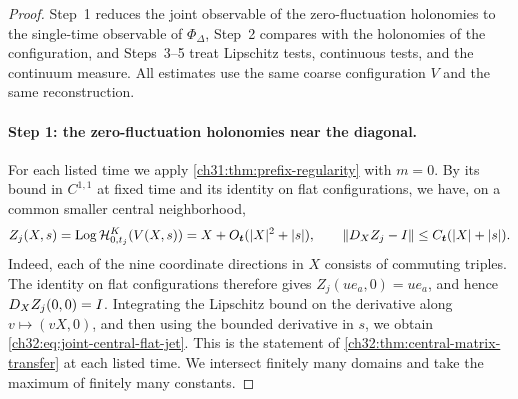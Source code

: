 \begin{proof}
Step~1 reduces the joint observable of the zero-fluctuation holonomies to the single-time observable of $\Phi_\Delta$, Step~2 compares with the holonomies of the configuration, and Steps~3--5 treat Lipschitz tests, continuous tests, and the continuum measure. All estimates use the same coarse configuration $V$ and the same reconstruction.

\paragraph{Step 1: the zero-fluctuation holonomies near the diagonal.}
For each listed time we apply \cref{ch31:thm:prefix-regularity} with $m=0$. By its bound in $C^{1,1}$ at fixed time and its identity on flat configurations, we have, on a common smaller central neighborhood,
\begin{equation}\label{ch32:eq:joint-central-flat-jet}
 Z_j(X,s)=\operatorname{Log}\mathcal H^K_{0,t_j}(V(X,s))=X+O_{\boldsymbol t}(\lvert X\rvert^2+\lvert s\rvert),\qquad\lVert D_XZ_j-I\rVert\le C_{\boldsymbol t}(\lvert X\rvert+\lvert s\rvert).
\end{equation}
Indeed, each of the nine coordinate directions in $X$ consists of commuting triples. The identity on flat configurations therefore gives $Z_j(ue_a,0)=ue_a$, and hence $D_XZ_j(0,0)=I$. Integrating the Lipschitz bound on the derivative along $v\mapsto(vX,0)$, and then using the bounded derivative in $s$, we obtain \eqref{ch32:eq:joint-central-flat-jet}. This is the statement of \cref{ch32:thm:central-matrix-transfer} at each listed time. We intersect finitely many domains and take the maximum of finitely many constants.


\end{proof}
